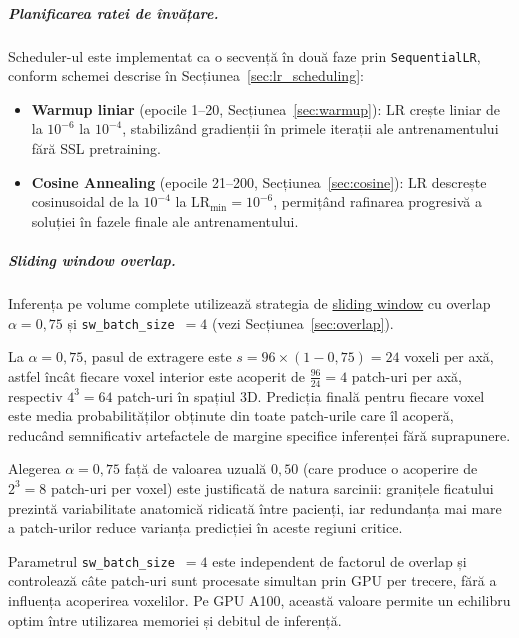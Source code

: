 \documentclass[12pt, a4paper]{report}
\begin{document}
\subparagraph{Planificarea ratei de învățare.}
Scheduler-ul este implementat ca o secvență în două faze prin
\texttt{SequentialLR}, conform schemei descrise în
Secțiunea~\ref{sec:lr_scheduling}:

\begin{itemize}
    \item \textbf{Warmup liniar} (epocile 1--20,
          Secțiunea~\ref{sec:warmup}): $\text{LR}$ crește liniar
          de la $10^{-6}$ la $10^{-4}$, stabilizând gradienții
          în primele iterații ale antrenamentului fără SSL
          pretraining.

    \item \textbf{Cosine Annealing} (epocile 21--200,
          Secțiunea~\ref{sec:cosine}): $\text{LR}$ descrește
          cosinusoidal de la $10^{-4}$ la $\text{LR}_{\min} =
          10^{-6}$, permițând rafinarea progresivă a soluției
          în fazele finale ale antrenamentului.
\end{itemize}



\subparagraph{Sliding window overlap.}
Inferența pe volume complete utilizează strategia de
\hyperref[sec:overlap]{sliding window} cu overlap
$\alpha = 0{,}75$ și \texttt{sw\_batch\_size}~$= 4$
(vezi Secțiunea~\ref{sec:overlap}).

La $\alpha = 0{,}75$, pasul de extragere este
$s = 96 \times (1 - 0{,}75) = 24$ voxeli per axă, astfel
încât fiecare voxel interior este acoperit de
$\frac{96}{24} = 4$ patch-uri per axă, respectiv
$4^3 = 64$ patch-uri în spațiul 3D. Predicția finală
pentru fiecare voxel este media probabilităților obținute
din toate patch-urile care îl acoperă, reducând semnificativ
artefactele de margine specifice inferenței fără suprapunere.

Alegerea $\alpha = 0{,}75$ față de valoarea uzuală
$0{,}50$ (care produce o acoperire de $2^3 = 8$ patch-uri
per voxel) este justificată de natura sarcinii: granițele
ficatului prezintă variabilitate anatomică ridicată între
pacienți, iar redundanța mai mare a patch-urilor reduce
varianța predicției în aceste regiuni critice.

Parametrul \texttt{sw\_batch\_size}~$= 4$ este independent
de factorul de overlap și controlează câte patch-uri sunt
procesate simultan prin GPU per trecere, fără a influența
acoperirea voxelilor. Pe GPU A100, această valoare permite
un echilibru optim între utilizarea memoriei și debitul
de inferență.
\end{document}
